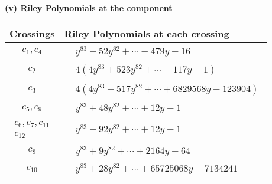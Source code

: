\documentclass[1p]{elsarticle_modified}
\theoremstyle{definition}
\begin{document}
\newpage\renewcommand{\arraystretch}{1}
\flushleft \textbf{(v) Riley Polynomials at the component}\newline \\
\begin{tabular}{m{50pt}|m{274pt}}
Crossings & \hspace{64pt}Riley Polynomials at each crossing \\
\hline $$\begin{aligned}c_{1},c_{4}\end{aligned}$$&$\begin{aligned}
&y^{83}-52 y^{82}+\cdots-479 y-16
\end{aligned}$\\
\hline $$\begin{aligned}c_{2}\end{aligned}$$&$\begin{aligned}
&4(4 y^{83}+523 y^{82}+\cdots-117 y-1)
\end{aligned}$\\
\hline $$\begin{aligned}c_{3}\end{aligned}$$&$\begin{aligned}
&4(4 y^{83}-517 y^{82}+\cdots+6829568 y-123904)
\end{aligned}$\\
\hline $$\begin{aligned}c_{5},c_{9}\end{aligned}$$&$\begin{aligned}
&y^{83}+48 y^{82}+\cdots+12 y-1
\end{aligned}$\\
\hline $$\begin{aligned}c_{6},c_{7},c_{11}\\c_{12}\end{aligned}$$&$\begin{aligned}
&y^{83}-92 y^{82}+\cdots+12 y-1
\end{aligned}$\\
\hline $$\begin{aligned}c_{8}\end{aligned}$$&$\begin{aligned}
&y^{83}+9 y^{82}+\cdots+2164 y-64
\end{aligned}$\\
\hline $$\begin{aligned}c_{10}\end{aligned}$$&$\begin{aligned}
&y^{83}+28 y^{82}+\cdots+65725068 y-7134241
\end{aligned}$\\
\hline
\end{tabular}\\~\\
\end{document}
